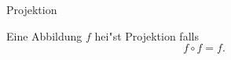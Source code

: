 \documentclass[class=article, crop=false]{standalone}
\begin{document}
\begin{zettel}{Projektion}
\begin{flashcard}
\begin{definition}[Projektion]
    Eine Abbildung $f$ hei"st Projektion falls
\[
f \circ f = f
.\]
\end{definition}

\end{flashcard}
\end{zettel}
\end{document}
